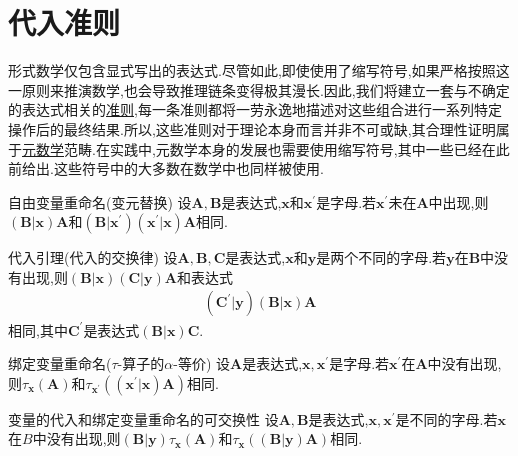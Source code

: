 \section{代入准则}

形式数学仅包含显式写出的表达式.尽管如此,即使使用了缩写符号,如果严格按照这一原则来推演数学,也会导致推理链条变得极其漫长.因此,我们将建立一套与不确定的表达式相关的\underline{准则},每一条准则都将一劳永逸地描述对这些组合进行一系列特定操作后的最终结果.所以,这些准则对于理论本身而言并非不可或缺,其合理性证明属于\underline{元数学}范畴.在实践中,元数学本身的发展也需要使用缩写符号,其中一些已经在此前给出.这些符号中的大多数在数学中也同样被使用.

\begin{metatheorem}{自由变量重命名(变元替换)}{}
	设$\boldsymbol{A},\boldsymbol{B}$是表达式,$\boldsymbol{x}$和$\boldsymbol{x}^{\prime}$是字母.若$\boldsymbol{x}^{\prime}$未在$\boldsymbol{A}$中出现,则$\left(\boldsymbol{B}|\boldsymbol{x}\right)\boldsymbol{A}$和$\left(\boldsymbol{B}|\boldsymbol{x}^{\prime}\right)\left(\boldsymbol{x}^{\prime}|\boldsymbol{x}\right)\boldsymbol{A}$相同.
\end{metatheorem}

\begin{metatheorem}{代入引理(代入的交换律)}{}
	设$\boldsymbol{A},\boldsymbol{B},\boldsymbol{C}$是表达式,$\boldsymbol{x}$和$\boldsymbol{y}$是两个不同的字母.若$\boldsymbol{y}$在$\boldsymbol{B}$中没有出现,则$\left(\boldsymbol{B}|\boldsymbol{x}\right)\left(\boldsymbol{C}|\boldsymbol{y}\right)\boldsymbol{A}$和表达式
	\begin{align*}
		\left(\boldsymbol{C}^{\prime}|\boldsymbol{y}\right)\left(\boldsymbol{B}|\boldsymbol{x}\right)\boldsymbol{A}
	\end{align*}
	相同,其中$\boldsymbol{C}^{\prime}$是表达式$\left(\boldsymbol{B}|\boldsymbol{x}\right)\boldsymbol{C}$.
\end{metatheorem}

\begin{metatheorem}{绑定变量重命名($\tau$-算子的$\alpha$-等价)}{}
	设$\boldsymbol{A}$是表达式,$\boldsymbol{x},\boldsymbol{x}^{\prime}$是字母.若$\boldsymbol{x}^{\prime}$在$\boldsymbol{A}$中没有出现,则$\tau_{\boldsymbol{x}}\left(\boldsymbol{A}\right)$和$\tau_{\boldsymbol{x}^{\prime}}\left(\left(\boldsymbol{x}^{\prime}|\boldsymbol{x}\right)\boldsymbol{A}\right)$相同.
\end{metatheorem}

\begin{metatheorem}{变量的代入和绑定变量重命名的可交换性}{}
	设$\boldsymbol{A},\boldsymbol{B}$是表达式,$\boldsymbol{x},\boldsymbol{x}^{\prime}$是不同的字母.若$\boldsymbol{x}$在$B$中没有出现,则$\left(\boldsymbol{B}|\boldsymbol{y}\right)\tau_{\boldsymbol{x}}\left(\boldsymbol{A}\right)$和$\tau_{\boldsymbol{x}}\left(\left(\boldsymbol{B}|\boldsymbol{y}\right)\boldsymbol{A}\right)$相同.
\end{metatheorem}

